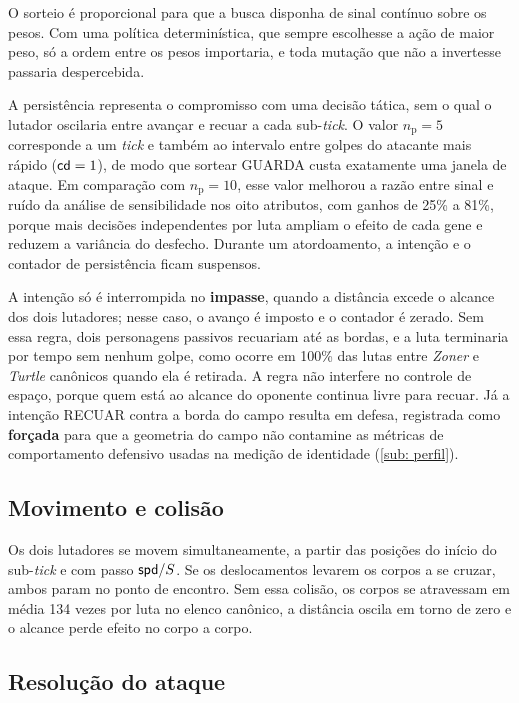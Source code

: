 O sorteio é proporcional para que a busca disponha de sinal contínuo sobre os pesos. Com uma política determinística, que sempre escolhesse a ação de maior peso, só a ordem entre os pesos importaria, e toda mutação que não a invertesse passaria despercebida.

A persistência representa o compromisso com uma decisão tática, sem o qual o lutador oscilaria entre avançar e recuar a cada sub-\textit{tick}. O valor $n_{\mathrm{p}} = 5$ corresponde a um \textit{tick} e também ao intervalo entre golpes do atacante mais rápido ($\mathsf{cd} = 1$), de modo que sortear GUARDA custa exatamente uma janela de ataque. Em comparação com $n_{\mathrm{p}} = 10$, esse valor melhorou a razão entre sinal e ruído da análise de sensibilidade nos oito atributos, com ganhos de 25\% a 81\%, porque mais decisões independentes por luta ampliam o efeito de cada gene e reduzem a variância do desfecho. Durante um atordoamento, a intenção e o contador de persistência ficam suspensos.

A intenção só é interrompida no \textbf{impasse}, quando a distância excede o alcance dos dois lutadores; nesse caso, o avanço é imposto e o contador é zerado. Sem essa regra, dois personagens passivos recuariam até as bordas, e a luta terminaria por tempo sem nenhum golpe, como ocorre em 100\% das lutas entre \textit{Zoner} e \textit{Turtle} canônicos quando ela é retirada. A regra não interfere no controle de espaço, porque quem está ao alcance do oponente continua livre para recuar. Já a intenção RECUAR contra a borda do campo resulta em defesa, registrada como \textbf{forçada} para que a geometria do campo não contamine as métricas de comportamento defensivo usadas na medição de identidade (\autoref{sub: perfil}).

\subsection{Movimento e colisão}
\label{sub: movimento}

Os dois lutadores se movem simultaneamente, a partir das posições do início do sub-\textit{tick} e com passo $\mathsf{spd}/S$. Se os deslocamentos levarem os corpos a se cruzar, ambos param no ponto de encontro. Sem essa colisão, os corpos se atravessam em média 134 vezes por luta no elenco canônico, a distância oscila em torno de zero e o alcance perde efeito no corpo a corpo.

\subsection{Resolução do ataque}
\label{sub: ataque}

